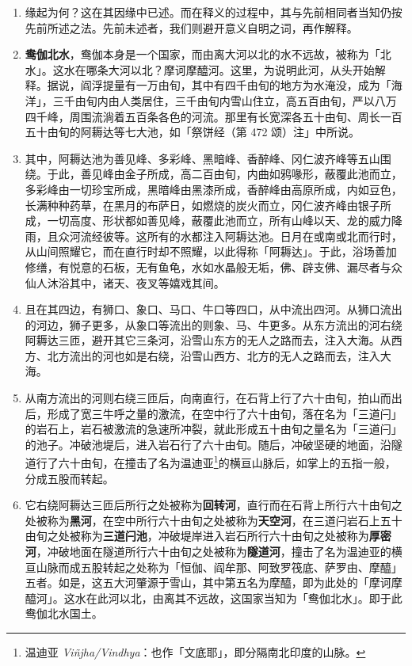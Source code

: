 \begin{enumerate}\item 缘起为何？这在其因缘中已述。而在释义的过程中，其与先前相同者当知仍按先前所述之法。先前未述者，我们则避开意义自明之词，再作解释。
\item \textbf{鸯伽北水}，鸯伽本身是一个国家，而由离大河以北的水不远故，被称为「北水」。这水在哪条大河以北？摩诃摩醯河。这里，为说明此河，从头开始解释。据说，阎浮提量有一万由旬，其中有四千由旬的地方为水淹没，成为「海洋」，三千由旬内由人类居住，三千由旬内雪山住立，高五百由旬，严以八万四千峰，周围流淌着五百条各色的河流。那里有长宽深各五十由旬、周长一百五十由旬的阿耨达等七大池，如「祭饼经（第 472 颂）注」中所说。
\item 其中，阿耨达池为善见峰、多彩峰、黑暗峰、香醉峰、冈仁波齐峰等五山围绕。于此，善见峰由金子所成，高二百由旬，内曲如鸦喙形，蔽覆此池而立，多彩峰由一切珍宝所成，黑暗峰由黑漆所成，香醉峰由高原所成，内如豆色，长满种种药草，在黑月的布萨日，如燃烧的炭火而立，冈仁波齐峰由银子所成，一切高度、形状都如善见峰，蔽覆此池而立，所有山峰以天、龙的威力降雨，且众河流经彼等。这所有的水都注入阿耨达池。日月在或南或北而行时，从山间照耀它，而在直行时却不照耀，以此得称「阿耨达」。于此，浴场善加修缮，有悦意的石板，无有鱼龟，水如水晶般无垢，佛、辟支佛、漏尽者与众仙人沐浴其中，诸天、夜叉等嬉戏其间。
\item 且在其四边，有狮口、象口、马口、牛口等四口，从中流出四河。从狮口流出的河边，狮子更多，从象口等流出的则象、马、牛更多。从东方流出的河右绕阿耨达三匝，避开其它三条河，沿雪山东方的无人之路而去，注入大海。从西方、北方流出的河也如是右绕，沿雪山西方、北方的无人之路而去，注入大海。
\item 从南方流出的河则右绕三匝后，向南直行，在石背上行了六十由旬，拍山而出后，形成了宽三牛呼之量的激流，在空中行了六十由旬，落在名为「三道闩」的岩石上，岩石被激流的急速所冲裂，就此形成五十由旬之量名为「三道闩」的池子。冲破池堤后，进入岩石行了六十由旬。随后，冲破坚硬的地面，沿隧道行了六十由旬，在撞击了名为温迪亚\footnote{温迪亚 \textit{Viñjha/Vindhya}：也作「文底耶」，即分隔南北印度的山脉。}的横亘山脉后，如掌上的五指一般，分成五股而转起。
\item 它右绕阿耨达三匝后所行之处被称为\textbf{回转河}，直行而在石背上所行六十由旬之处被称为\textbf{黑河}，在空中所行六十由旬之处被称为\textbf{天空河}，在三道闩岩石上五十由旬之处被称为\textbf{三道闩池}，冲破堤岸进入岩石所行六十由旬之处被称为\textbf{厚密河}，冲破地面在隧道所行六十由旬之处被称为\textbf{隧道河}，撞击了名为温迪亚的横亘山脉而成五股转起之处称为「恒伽、阎牟那、阿致罗筏底、萨罗由、摩醯」五者。如是，这五大河肇源于雪山，其中第五名为摩醯，即为此处的「摩诃摩醯河」。这水在此河以北，由离其不远故，这国家当知为「鸯伽北水」。即于此鸯伽北水国土。

\end{enumerate}
